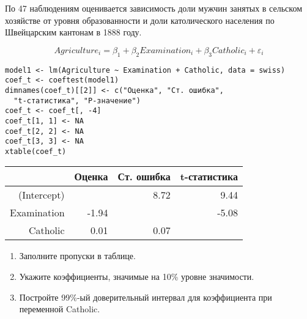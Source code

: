 \begin{problem}
По 47 наблюдениям оценивается зависимость доли мужчин занятых в сельском хозяйстве от уровня образованности и доли католического населения по Швейцарским кантонам в 1888 году.

\[
Agriculture_i=\beta_1+\beta_2 Examination_i+\beta_3 Catholic_i+\varepsilon_i
\]

\begin{verbatim}
model1 <- lm(Agriculture ~ Examination + Catholic, data = swiss)
coef_t <- coeftest(model1)
dimnames(coef_t)[[2]] <- c("Оценка", "Ст. ошибка",
  "t-статистика", "P-значение")
coef_t <- coef_t[, -4]
coef_t[1, 1] <- NA
coef_t[2, 2] <- NA
coef_t[3, 3] <- NA
xtable(coef_t)
\end{verbatim}

\begin{tabular}{rrrr}
  \hline
 & Оценка & Ст. ошибка & t-статистика \\
  \hline
(Intercept) &  & 8.72 & 9.44 \\
  Examination & -1.94 &  & -5.08 \\
  Catholic & 0.01 & 0.07 &  \\
   \hline
\end{tabular}



\begin{enumerate}
\item Заполните пропуски в таблице.
\item Укажите коэффициенты, значимые на 10\% уровне значимости.
\item Постройте 99\%-ый доверительный интервал для коэффициента при переменной Catholic.
\end{enumerate}

\begin{sol}
\end{sol}
\end{problem}




